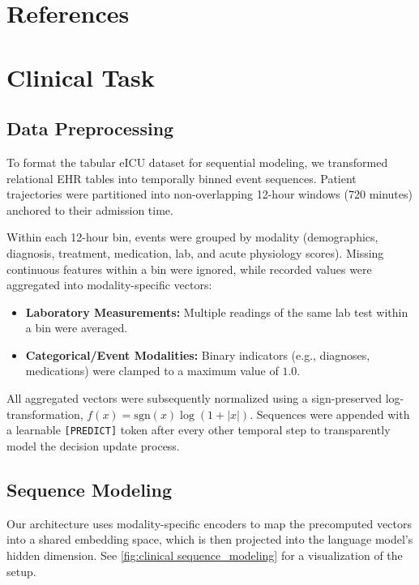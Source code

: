\documentclass{article}
\begin{document}
\section*{References}
  
  
\medskip
{
\small


\clearpage
\appendix
\renewcommand{\thefigure}{A.\arabic{figure}}
\setcounter{figure}{0}

\renewcommand{\thetable}{A.\arabic{table}}
\setcounter{table}{0}

\section{Clinical Task}
\label{sec:clinical_data_preprocessing}

\subsection{Data Preprocessing}
To format the tabular eICU dataset for sequential modeling, we transformed relational EHR tables into temporally binned event sequences. Patient trajectories were partitioned into non-overlapping 12-hour windows (720 minutes) anchored to their admission time. 

Within each 12-hour bin, events were grouped by modality (demographics, diagnosis, treatment, medication, lab, and acute physiology scores). Missing continuous features within a bin were ignored, while recorded values were aggregated into modality-specific vectors:
\begin{itemize}
    \item \textbf{Laboratory Measurements:} Multiple readings of the same lab test within a bin were averaged.
    \item \textbf{Categorical/Event Modalities:} Binary indicators (e.g., diagnoses, medications) were clamped to a maximum value of $1.0$.
\end{itemize}
All aggregated vectors were subsequently normalized using a sign-preserved log-transformation, $f(x) = \text{sgn}(x) \log(1 + |x|)$. Sequences were appended with a learnable \texttt{[PREDICT]} token after every other temporal step to transparently model the decision update process. 



\subsection{Sequence Modeling}
Our architecture uses modality-specific encoders to map the precomputed vectors into a shared embedding space, which is then projected into the language model's hidden dimension. See \ref{fig:clinical sequence_modeling} for a visualization of the setup.

}
\end{document}
